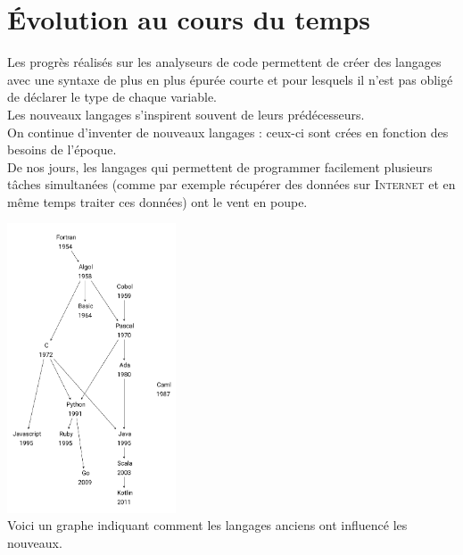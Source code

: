 \section{\'Evolution au cours du temps}


Les progrès réalisés sur les analyseurs de code permettent de créer des langages avec une syntaxe de plus en plus épurée courte et pour lesquels il n'est pas obligé de déclarer le type de chaque variable.\\
Les nouveaux langages s'inspirent souvent de leurs prédécesseurs.\\
    
On continue d'inventer de nouveaux langages : ceux-ci sont crées en fonction des besoins de l'époque.\\
De nos jours, les langages qui permettent de programmer facilement plusieurs tâches simultanées (comme par exemple récupérer des données sur \textsc{Internet} et en même temps traiter ces données) ont le vent en poupe.

\begin{center}
    \includegraphics[width=5cm]{img/genealogie.png}\\ \scriptsize   Voici un graphe indiquant comment les langages anciens ont influencé les nouveaux.\\
\end{center}
\ \\[3em]



